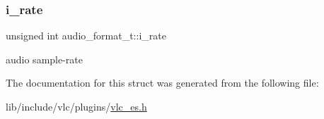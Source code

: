 \subsubsection{\texorpdfstring{i\+\_\+rate}{i\_rate}}
{\footnotesize\ttfamily unsigned int audio\+\_\+format\+\_\+t\+::i\+\_\+rate}

audio sample-\/rate 

The documentation for this struct was generated from the following file\+:\begin{DoxyCompactItemize}
\item 
lib/include/vlc/plugins/\hyperlink{vlc__es_8h}{vlc\+\_\+es.\+h}\end{DoxyCompactItemize}
